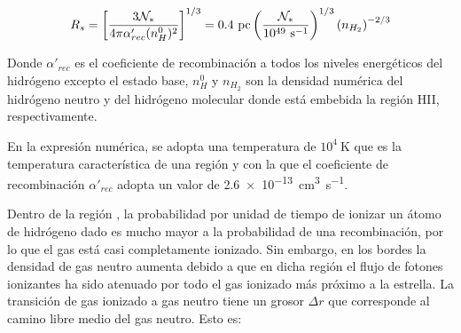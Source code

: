 



\begin{align}
  R_s = \left[\frac{3\mathcal{N}_*}{4\pi\alpha'_{rec}(n^0_H)^2}\right]^{1/3} = 0.4\mathrm{~pc}\left(\frac{\mathcal{N}_*}{10^{49}\mathrm{~s^{-1}}}\right)^{1/3}\left(n_{H_2}\right)^{-2/3} \label{eq:stromgren}
\end{align}

Donde $\alpha'_{rec}$ es el coeficiente de recombinación a todos los niveles energéticos del hidrógeno excepto el estado base, $n^0_H$ y $n_{H_2}$ son la densidad numérica del hidrógeno neutro y del hidrógeno molecular donde está embebida la región HII, respectivamente.

En la expresión numérica, se adopta una temperatura de $10^4\mathrm{~K}$ que es la temperatura característica de una región  y con la que el coeficiente de recombinación $\alpha'_{rec}$ adopta un valor de \SI{2.6e-13}{cm^3.s^{-1}}.

Dentro de la región , la probabilidad por unidad de tiempo de ionizar un átomo de hidrógeno dado es mucho mayor a la probabilidad de una recombinación, por lo que el gas está casi completamente ionizado. Sin embargo, en los bordes la densidad de gas neutro aumenta debido a que en dicha región el flujo de fotones ionizantes ha sido atenuado por todo el gas ionizado más próximo a la estrella. La transición de gas ionizado a gas neutro tiene un grosor $\Delta r$ que corresponde al camino libre medio del gas neutro. Esto es:

